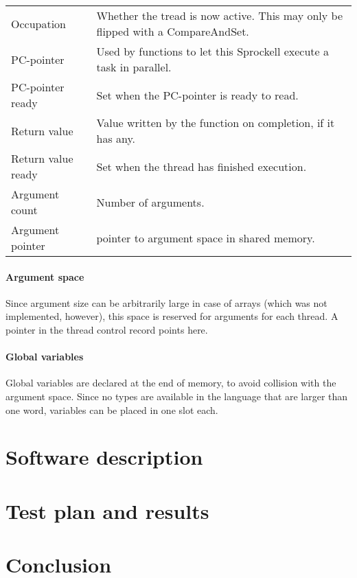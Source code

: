 \documentclass[10pt,a4paper]{report}
\begin{document}
\begin{tabular}{| l | l |}
\hline
Occupation 
	& Whether the tread is now active. This may only be flipped with a CompareAndSet. \\
PC-pointer 
	& Used by functions to let this Sprockell execute a task in parallel. \\
PC-pointer ready 
	& Set when the PC-pointer is ready to read. \\
Return value 
	& Value written by the function on completion, if it has any. \\
Return value ready 
	& Set when the thread has finished execution. \\
Argument count 
	& Number of arguments. \\
Argument pointer 
	& pointer to argument space in shared memory. \\ 
\hline
\end{tabular}

\subsubsection{Argument space}
Since argument size can be arbitrarily large in case of arrays (which was not implemented, however), this space is reserved for arguments for each thread. A pointer in the thread control record points here.
       
\subsubsection{Global variables}
Global variables are declared at the end of memory, to avoid collision with the argument space. Since no types are available in the language that are larger than one word, variables can be placed in one slot each.


\chapter{Software description}

\chapter{Test plan and results}

\chapter{Conclusion}
\end{document}
